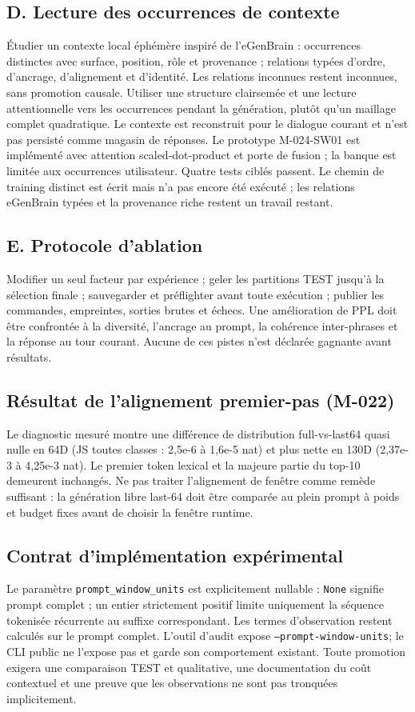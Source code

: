 \documentclass[11pt,a4paper]{report}
\begin{document}
\subsection*{D. Lecture des occurrences de contexte}
Étudier un contexte local éphémère inspiré de l'eGenBrain : occurrences distinctes avec surface, position, rôle et provenance ; relations typées d'ordre, d'ancrage, d'alignement et d'identité. Les relations inconnues restent inconnues, sans promotion causale. Utiliser une structure clairsemée et une lecture attentionnelle vers les occurrences pendant la génération, plutôt qu'un maillage complet quadratique. Le contexte est reconstruit pour le dialogue courant et n'est pas persisté comme magasin de réponses. Le prototype M-024-SW01 est implémenté avec attention scaled-dot-product et porte de fusion ; la banque est limitée aux occurrences utilisateur. Quatre tests ciblés passent. Le chemin de training distinct est écrit mais n'a pas encore été exécuté ; les relations eGenBrain typées et la provenance riche restent un travail restant.

\subsection*{E. Protocole d'ablation}
Modifier un seul facteur par expérience ; geler les partitions TEST jusqu'à la sélection finale ; sauvegarder et préflighter avant toute exécution ; publier les commandes, empreintes, sorties brutes et échecs. Une amélioration de PPL doit être confrontée à la diversité, l'ancrage au prompt, la cohérence inter-phrases et la réponse au tour courant. Aucune de ces pistes n'est déclarée gagnante avant résultats.

\subsection*{Résultat de l'alignement premier-pas (M-022)}
Le diagnostic mesuré montre une différence de distribution full-vs-last64 quasi nulle en 64D (JS toutes classes : 2,5e-6 à 1,6e-5 nat) et plus nette en 130D (2,37e-3 à 4,25e-3 nat). Le premier token lexical et la majeure partie du top-10 demeurent inchangés. Ne pas traiter l'alignement de fenêtre comme remède suffisant : la génération libre last-64 doit être comparée au plein prompt à poids et budget fixes avant de choisir la fenêtre runtime.

\subsection*{Contrat d'implémentation expérimental}
Le paramètre \texttt{prompt\_window\_units} est explicitement nullable : \texttt{None} signifie prompt complet ; un entier strictement positif limite uniquement la séquence tokenisée récurrente au suffixe correspondant. Les termes d'observation restent calculés sur le prompt complet. L'outil d'audit expose \texttt{--prompt-window-units}; le CLI public ne l'expose pas et garde son comportement existant. Toute promotion exigera une comparaison TEST et qualitative, une documentation du coût contextuel et une preuve que les observations ne sont pas tronquées implicitement.
\end{document}
